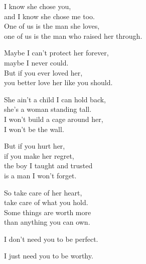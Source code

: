 \begin{lyrics}

I know she chose you,\\
and I know she chose me too.\\
One of us is the man she loves,\\
one of us is the man who raised her through.

Maybe I can't protect her forever,\\
maybe I never could.\\
But if you ever loved her,\\
you better love her like you should.


She ain't a child I can hold back,\\
she's a woman standing tall.\\
I won't build a cage around her,\\
I won't be the wall.

But if you hurt her,\\
if you make her regret,\\
the boy I taught and trusted\\
is a man I won't forget.

So take care of her heart,\\
take care of what you hold.\\
Some things are worth more\\
than anything you can own.

I don't need you to be perfect.

I just need you to be worthy.
\end{lyrics}

